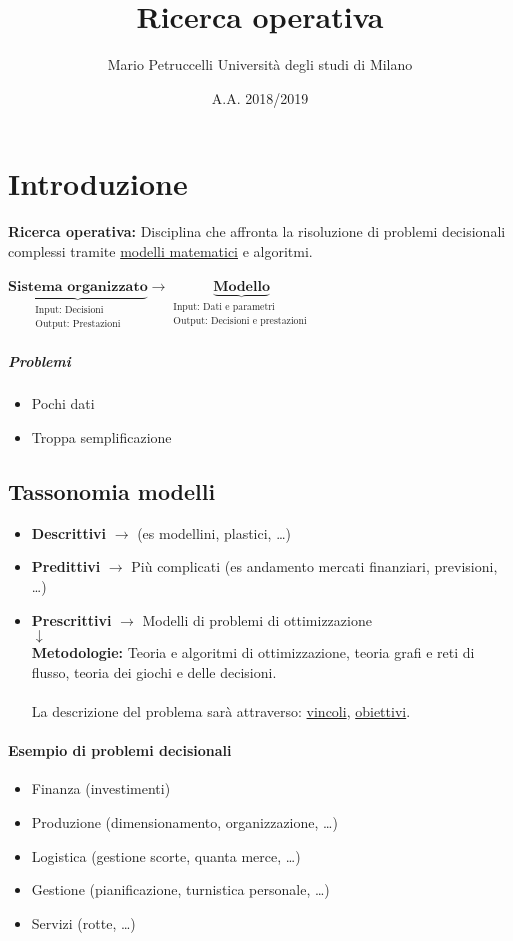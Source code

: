 \documentclass[12pt, letterpaper]{article}
\title{Ricerca operativa}
\author{Mario Petruccelli \cr Università degli studi di Milano}
\date{A.A. 2018/2019}
\begin{document}
	\begin{titlepage}
		\maketitle
		\newpage
		\tableofcontents
	\end{titlepage}


	\section{Introduzione}
	\textbf{Ricerca operativa:} Disciplina che affronta la risoluzione di problemi decisionali complessi tramite 	\underline{modelli matematici} e algoritmi.
	\\\\$\underbrace{\textbf{Sistema organizzato}}_{\substack{\text{Input: Decisioni} \\ \text {Output: Prestazioni}}}  \rightarrow \underbrace{\textbf{Modello}}_{\substack{\text{Input: Dati e parametri}\\ \text{Output: Decisioni e prestazioni }}}$
	\subparagraph{Problemi}
	\begin{itemize}
	\item Pochi dati
	\item Troppa semplificazione
	\end{itemize}
	\subsection{Tassonomia modelli}
	\begin{itemize}
		\item \textbf{Descrittivi} $\rightarrow$ (es modellini, plastici, \dots)
		\item \textbf{Predittivi} $\rightarrow$ Più complicati (es andamento mercati finanziari, previsioni, \dots)
		\item \textbf{Prescrittivi} $\rightarrow$ Modelli di problemi di ottimizzazione
		\\ \hspace*{0.8cm} $\downarrow$
		\\\textbf{Metodologie:} Teoria e algoritmi di ottimizzazione, teoria grafi e reti di flusso, teoria dei giochi e delle decisioni.
		\\\\La descrizione del problema sarà attraverso: \underline{vincoli}, \underline{obiettivi}.
	\end{itemize}
	\paragraph{Esempio di problemi decisionali}
	\begin{itemize}
		\item Finanza (investimenti)
		\item Produzione (dimensionamento, organizzazione, \dots)
		\item Logistica (gestione scorte, quanta merce, \dots)
		\item Gestione (pianificazione, turnistica personale, \dots)
		\item Servizi (rotte, \dots)
	\end{itemize}
\end{document}
